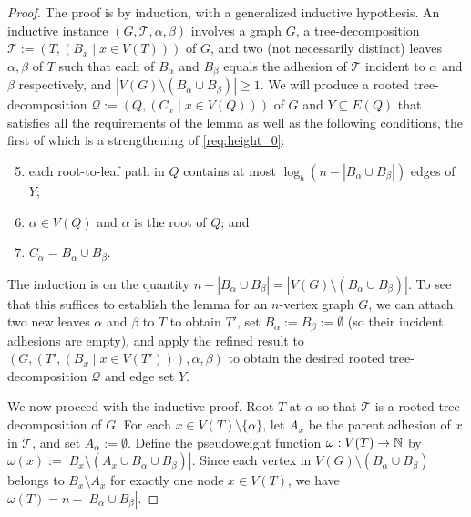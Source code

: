 \documentclass{patmorin}
\renewcommand{\ge}{\geqslant}
\newcommand{\calQ}{\mathcal{Q}}
\newcommand{\calT}{\mathcal{T}}
\begin{document}
\begin{proof}
  The proof is by induction, with a generalized inductive hypothesis. An inductive instance $(G,\calT, \alpha, \beta)$ involves a graph $G$, a tree-decomposition $\calT:=(T,(B_x\mid x\in V(T)))$ of $G$, and two (not necessarily distinct) leaves $\alpha,\beta$ of $T$ such that each of $B_\alpha$ and $B_\beta$ equals the adhesion of $\calT$ incident to $\alpha$ and $\beta$ respectively, and $|V(G)\setminus (B_\alpha\cup B_\beta)|\ge 1$.  We will produce a rooted tree-decomposition $\calQ:=(Q,(C_x\mid x\in V(Q)))$ of $G$ and $Y\subseteq E(Q)$ that satisfies all the requirements of the lemma as well as the following conditions, the first of which is a strengthening of \ref{req:height_0}:
  \begin{enumerate}[nosep,nolistsep,label=\rm(\alph*)]\setcounter{enumi}{4}
    \item\label{req:height_prime_0} each root-to-leaf path in $Q$ contains at most $\log_b(n-|B_\alpha\cup B_\beta|)$ edges of $Y$;
    \item\label{req:root_0} $\alpha\in V(Q)$ and $\alpha$ is the root of $Q$; and
    \item\label{req:adhesion_pairs_0} $C_\alpha=B_\alpha\cup B_\beta$.
  \end{enumerate}
  The induction is on the quantity $n-|B_\alpha\cup B_\beta| = |V(G)\setminus (B_\alpha\cup B_\beta)|$.  To see that this suffices to establish the lemma for an $n$-vertex graph $G$, we can attach two new leaves $\alpha$ and $\beta$ to $T$ to obtain $T'$, set $B_\alpha:=B_\beta:=\emptyset$ (so their incident adhesions are empty), and apply the refined result to $(G,(T',(B_x\mid x\in V(T'))),\alpha,\beta)$ to obtain the desired rooted tree-decomposition $\calQ$ and edge set $Y$.

  We now proceed with the inductive proof.  Root $T$ at $\alpha$ so that $\calT$ is a rooted tree-decomposition of $G$.  For each $x\in V(T)\setminus\{\alpha\}$, let $A_x$ be the parent adhesion of $x$ in $\calT$, and set $A_\alpha:=\emptyset$.  Define the pseudoweight function $\omega: V(T)\to\mathbb{N}$ by $\omega(x):=|B_x\setminus (A_x\cup B_\alpha\cup B_\beta)|$.  Since each vertex in $V(G)\setminus (B_\alpha\cup B_\beta)$ belongs to $B_x\setminus A_x$ for exactly one node $x\in V(T)$, we have $\omega(T) = n-|B_\alpha\cup B_\beta|$.


\end{proof}
\end{document}
